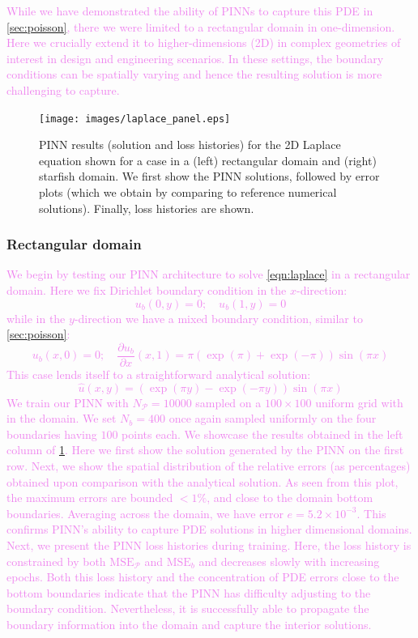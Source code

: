 \documentclass[11pt]{article}
\newcommand{\mse}{\textrm{MSE}}
\newcommand{\pde}{\ensuremath{\mathcal{P}}}
\newcommand{\newcontent}[1]{\textcolor{violet}{#1}}
\begin{document}
\newcontent{
While we have demonstrated the ability of PINNs to capture this PDE in
\cref{sec:poisson}, there we were limited to a rectangular domain in one-dimension.
Here we crucially extend it to higher-dimensions (2D) in complex geometries
of interest in design and engineering scenarios. In these settings, the
boundary conditions can be spatially varying and hence the
resulting solution is more challenging to capture.
}

\begin{figure}[htbp]
\centering
\texttt{[image: images/laplace\_panel.eps]}
\caption{\label{fig:laplace_results}PINN results (solution and loss histories) for the 2D Laplace equation shown for a case in a (left) rectangular domain and (right) starfish domain. We first show the PINN solutions, followed by error plots (which we obtain by comparing to reference numerical solutions). Finally, loss histories are shown.}
\end{figure}

\subsubsection{Rectangular domain}
\label{sec:orgabbae02}
\newcontent{
We begin by testing our PINN architecture to solve \cref{eqn:laplace} in a
rectangular domain. Here we fix Dirichlet boundary condition in the
\(x\)-direction:
\[ u_b(0, y) = 0;\quad  u_b(1,  y) = 0\]
while in the \(y\)-direction we have a mixed boundary
condition, similar to \cref{sec:poisson}:
\[ u_b(x, 0) = 0 ;\quad \frac{\partial u_b}{\partial x}(x, 1) = \pi\left(
	\exp{\left(\pi\right)} + \exp{\left(-\pi\right)} \right) \sin\left( \pi x\right)\]
This case lends itself to a straightforward analytical solution:
\[
	\hat{u}(x, y) = \left(\exp{\left(\pi y\right)} - \exp{\left(-\pi y\right)} \right) \sin\left( \pi x\right)
	\]
}
\newcontent{
We train our PINN with \(N_\pde = 10000\) sampled on a \(100 \times 100\) uniform
grid with in the domain. We set \(N_b = 400\) once again sampled uniformly on
the four boundaries having \(100\) points each. We showcase the results obtained
in the left column of \cref{fig:laplace_results}. Here we first show the
solution generated by the PINN on the first row. Next, we show the spatial
distribution of the relative errors (as percentages) obtained upon
comparison with the analytical solution. As
seen from this plot, the maximum errors are bounded \(< 1\%\), and close to
the domain bottom boundaries. Averaging across the domain, we have error \(e = 5.2 \times 10^{-3}\).
This confirms PINN's ability to capture PDE
solutions in higher dimensional domains. Next, we present the PINN loss histories
during training.
Here, the loss history is constrained by both \(\mse_\pde\) and \(\mse_{b}\) and decreases slowly with increasing epochs. Both this
loss history and the concentration of PDE errors close to the bottom boundaries
indicate that the PINN has difficulty adjusting to the boundary condition.
Nevertheless, it is successfully able to propagate the boundary information
into the domain and capture the interior solutions.
}
\end{document}
